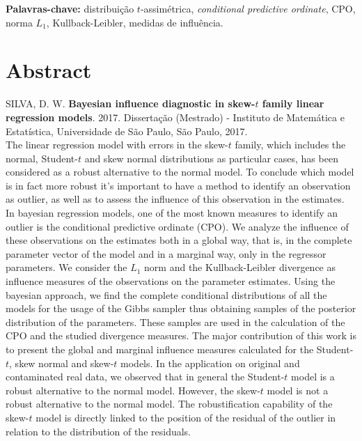 \documentclass[12pt,twoside,a4paper]{book}
\begin{document}
\noindent \textbf{Palavras-chave:} distribuição $t$-assimétrica, \textit{conditional predictive ordinate}, CPO, norma $L_1$, Kullback-Leibler, medidas de influência.

\chapter*{Abstract}
\noindent SILVA, D. W. \textbf{Bayesian influence diagnostic in skew-$t$ family  linear regression models}. 
2017. Dissertação (Mestrado) - Instituto de Matemática e Estatística,
Universidade de São Paulo, São Paulo, 2017.
\\



The linear regression model with errors in the skew-$t$ family, which includes the normal, Student-$t$ and skew normal distributions as particular cases, has been considered as a robust alternative to the normal model. To conclude which model is in fact more robust it's important to have a method to identify an observation as outlier, as well as to assess the influence of this observation in the estimates. In bayesian regression models, one of the most known measures to identify an outlier is the conditional predictive ordinate (CPO). We analyze the influence of these observations on the estimates both in a global way, that is, in the complete parameter vector of the model and in a marginal way, only in the regressor parameters. We consider the $L_1$ norm and the Kullback-Leibler divergence as influence measures of the observations on the parameter estimates. Using the bayesian approach, we find the complete conditional distributions of all the models for the usage of the Gibbs sampler thus obtaining samples of the posterior distribution of the parameters. These samples are used in the calculation of the CPO and the studied divergence measures. The major contribution of this work is to present the global and marginal influence measures calculated for the Student-$t$, skew normal and skew-$t$ models. In the application on original and contaminated real data, we observed that in general the Student-$t$ model is a robust alternative to the normal model. However, the skew-$t$ model is not a robust alternative to the normal model. The robustification capability of the skew-$t$ model is directly linked to the position of the residual of the outlier in relation to the distribution of the residuals.
\\
\end{document}

